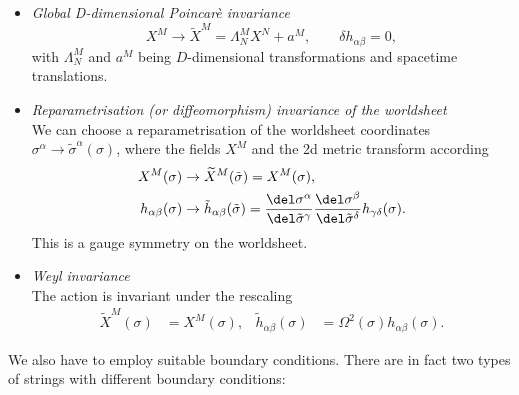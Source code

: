 \begin{itemize}
\item\textit{Global D-dimensional Poincarè invariance}
%
\begin{equation}
X^{M} \rightarrow \widetilde{X}^{M} = \Lambda_{N}^{M} X^{N} + a^{M}, \qquad \delta	h_{\alpha\beta} = 0,
\end{equation}
%
with $\Lambda_{N}^{M}$ and $a^{M}$ being $D$-dimensional  transformations and spacetime translations.
%
%
\item\textit{Reparametrisation (or diffeomorphism) invariance of the worldsheet}\\[2mm]
We can choose a reparametrisation of the worldsheet coordinates $\sigma^{\alpha}\rightarrow \tilde{\sigma}^{\alpha}(\sigma)$, where the fields $X^{M}$ and the 2d metric transform according
%
\begin{equation}
\begin{alignedat}{3}
X^{M}(\sigma) &\rightarrow \widetilde{X}^{M}(\tilde{\sigma}) = X^{M}(\sigma), \\
h_{\alpha\beta}(\sigma) &\rightarrow \tilde{h}_{\alpha\beta}(\tilde{\sigma}) = \frac{\del \sigma^{\alpha}}{\del \tilde{\sigma}^{\gamma}} \frac{\del \sigma^{\beta}}{\del \tilde{\sigma}^{\delta}}h_{\gamma\delta}(\sigma).
\end{alignedat}
\end{equation}
%
This is a gauge symmetry on the worldsheet.
%
%
\item\textit{Weyl invariance}\\
The action is invariant under the rescaling
\begin{align}
\widetilde{X}^{M}(\sigma) &= X^{M}(\sigma), &  \tilde{h}_{\alpha\beta}(\sigma)&=\mathit{\Omega}^{2}(\sigma)h_{\alpha\beta}(\sigma).
\end{align}
\end{itemize}
%
%
We also have to employ suitable boundary conditions. There are in fact two types of strings with different boundary conditions:
%
%

